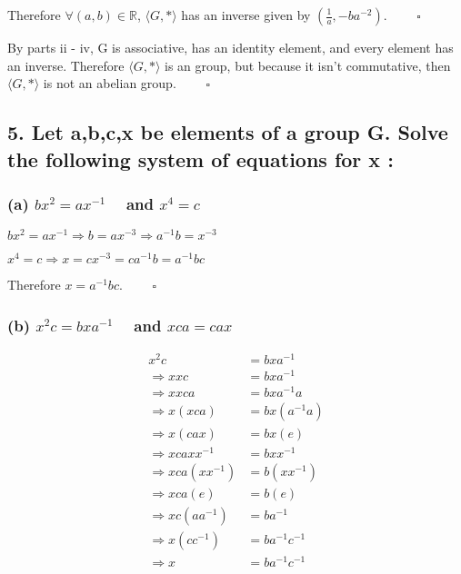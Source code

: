 \documentclass[
]{article}
\begin{document}
Therefore \(\forall (a,b)\in\mathbb{R}\), \(\langle G,*\rangle\) has an
inverse given by \((\frac{1}{a},-ba^{-2})\). \(\quad\quad\square\)

By parts ii - iv, G is associative, has an identity element, and every
element has an inverse. Therefore \(\langle G,*\rangle\) is an group,
but because it isn't commutative, then \(\langle G,*\rangle\) is not an
abelian group. \(\quad\quad\square\)

\hypertarget{let-abcx-be-elements-of-a-group-g.-solve-the-following-system-of-equations-for-x}{%
\subsection{5. Let a,b,c,x be elements of a group G. Solve the following
system of equations for x
:}\label{let-abcx-be-elements-of-a-group-g.-solve-the-following-system-of-equations-for-x}}

\hypertarget{a-bx2ax-1quad-and-x4c}{%
\subsubsection{\texorpdfstring{(a) \(bx^2=ax^{-1}\quad\) and
\(x^4=c\)}{(a) bx\^{}2=ax\^{}\{-1\}\textbackslash quad and x\^{}4=c}}\label{a-bx2ax-1quad-and-x4c}}

\(bx^2=ax^{-1}\Rightarrow b=ax^{-3}\Rightarrow a^{-1}b=x^{-3}\)

\(x^4=c\Rightarrow x=cx^{-3}=ca^{-1}b=a^{-1}bc\)

Therefore \(x=a^{-1}bc\). \(\quad\quad\square\)

\hypertarget{b-x2cbxa-1quad-and-xcacax}{%
\subsubsection{\texorpdfstring{(b) \(x^2c=bxa^{-1}\quad\) and
\(xca=cax\)}{(b) x\^{}2c=bxa\^{}\{-1\}\textbackslash quad and xca=cax}}\label{b-x2cbxa-1quad-and-xcacax}}

\begin{equation}
\label{5b}
\begin{split}
x^2c &= bxa^{-1}\\
\Rightarrow xxc &= bxa^{-1}\\
\Rightarrow xxca &= bxa^{-1}a\\
\Rightarrow x(xca) &= bx(a^{-1}a)\\
\Rightarrow x(cax) &= bx(e)\\
\Rightarrow xcaxx^{-1} &= bxx^{-1}\\
\Rightarrow xca(xx^{-1}) &= b(xx^{-1})\\
\Rightarrow xca(e) &= b(e)\\
\Rightarrow xc(aa^{-1}) &=ba^{-1}\\
\Rightarrow x(cc^{-1}) &= ba^{-1}c^{-1}\\
\Rightarrow x &= ba^{-1}c^{-1}
\end{split}
\end{equation}
\end{document}
